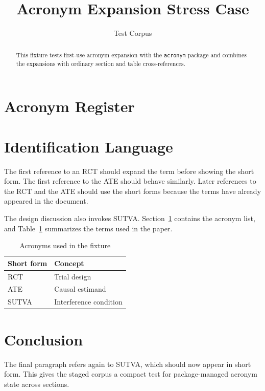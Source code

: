 \documentclass[11pt]{article}
\title{Acronym Expansion Stress Case}
\author{Test Corpus}
\date{}
\begin{document}
\maketitle

\begin{abstract}
This fixture tests first-use acronym expansion with the \texttt{acronym} package
and combines the expansions with ordinary section and table cross-references.
\end{abstract}

\section{Acronym Register}
\label{sec:register}

\begin{acronym}[SUTVA]
\end{acronym}

\section{Identification Language}
\label{sec:identification}

The first reference to an \ac{RCT} should expand the term before showing the
short form. The first reference to the \ac{ATE} should behave similarly. Later
references to the \ac{RCT} and the \ac{ATE} should use the short forms because
the terms have already appeared in the document.

The design discussion also invokes \ac{SUTVA}. Section~\ref{sec:register}
contains the acronym list, and Table~\ref{tab:acronym-check} summarizes the
terms used in the paper.

\begin{table}[htbp]
\centering
\caption{Acronyms used in the fixture}
\label{tab:acronym-check}
\begin{tabular}{ll}
\toprule
Short form & Concept \\
\midrule
\acs{RCT} & Trial design \\
\acs{ATE} & Causal estimand \\
\acs{SUTVA} & Interference condition \\
\bottomrule
\end{tabular}
\end{table}

\section{Conclusion}
\label{sec:conclusion}

The final paragraph refers again to \ac{SUTVA}, which should now appear in short
form. This gives the staged corpus a compact test for package-managed acronym
state across sections.
\end{document}
